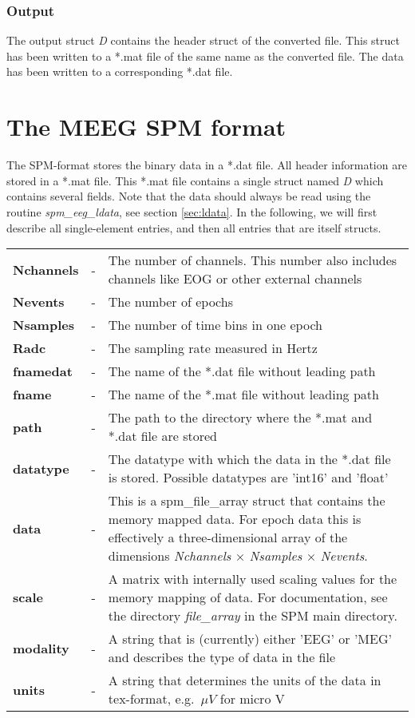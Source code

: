 \subsubsection{Output}
The output struct {\it D} contains the header struct of the converted
file. This struct has been written to a *.mat file of the same name as
the converted file. The data has been written to a corresponding *.dat
file.

\section{The MEEG SPM format}
The SPM-format stores the binary data in a *.dat file. All header
information are stored in a *.mat file. This *.mat file contains a
single struct named {\it D} which contains several fields. Note that
the data should always be read using the routine {\it spm\_eeg\_ldata},
see section \ref{sec:ldata}. In the following, we will first describe
all single-element entries, and then all entries that are itself structs.

\begin{tabular}{lcp{9cm}}
{\bf Nchannels} & - & The number of channels. This number also
includes channels like EOG or other external channels\\
{\bf Nevents} & - & The number of epochs\\
{\bf Nsamples} & - & The number of time bins in one epoch\\
{\bf Radc} & - &  The sampling rate measured in Hertz\\
{\bf fnamedat} & - &  The name of the *.dat file without leading
path\\
{\bf fname} & - &  The name of the *.mat file without leading path\\
{\bf path} & - &  The path to the directory where the *.mat and *.dat
file are stored\\
{\bf datatype} & - &  The datatype with which the data in the *.dat
file is stored. Possible datatypes are 'int16' and 'float'\\
{\bf data} & - & This is a spm\_file\_array struct that contains the
memory mapped data. For epoch data this is effectively a
three-dimensional array of the dimensions {\it Nchannels} $\times$
{\it Nsamples} $\times$ {\it Nevents}.\\
{\bf scale} & - &  A matrix with internally used scaling values for
the memory mapping of data. For documentation, see the directory
\textit{file\_array} in the SPM main directory.\\
{\bf modality} & - &  A string that is (currently) either 'EEG' or
'MEG' and describes the type of data in the file \\
{\bf units} & - &  A string that determines the units of the data in
tex-format, e.g.~$\mu V$ for micro V \\
\end{tabular}

